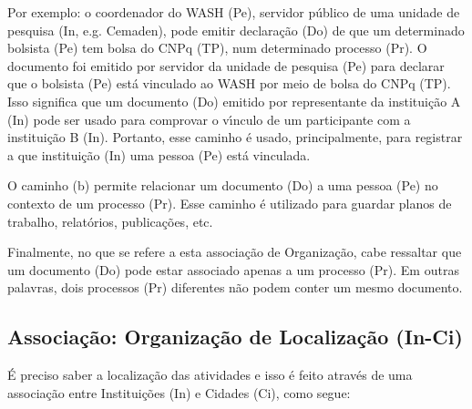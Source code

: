 \documentclass[
12pt,		%
openright,	%
twoside,  %
a4paper,			%
chapter=TITLE,		%
english,			%
french,				%
spanish,			%
brazil				%
]{USPSC-classe/USPSC}
\begin{document}
Por exemplo: o coordenador do WASH (Pe), servidor p\'ublico de uma unidade de pesquisa (In, e.g. Cemaden), pode emitir declara\c{c}\~ao (Do) de que um determinado bolsista (Pe) tem bolsa do CNPq (TP), num determinado processo (Pr). O documento foi emitido por servidor da unidade de pesquisa (Pe) para declarar que o bolsista (Pe) est\'a vinculado ao WASH por meio de bolsa do CNPq (TP). Isso significa que um documento (Do) emitido por representante da institui\c{c}\~ao A (In) pode ser usado para comprovar o v\'{\i}nculo de um participante com a institui\c{c}\~ao B (In). Portanto, esse caminho \'e usado, principalmente, para registrar a que institui\c{c}\~ao (In) uma pessoa (Pe) est\'a vinculada.




O caminho (b) permite relacionar um documento (Do) a uma pessoa (Pe) no contexto de um processo (Pr). Esse caminho \'e utilizado para guardar planos de trabalho, relat\'orios, publica\c{c}\~oes, etc.




Finalmente, no que se refere a esta associa\c{c}\~ao de \textquotedbl Organiza\c{c}\~ao\textquotedbl , cabe ressaltar que um documento (Do) pode estar associado apenas a um processo (Pr). Em outras palavras, dois processos (Pr) diferentes n\~ao podem conter um mesmo documento.




\subsection[Associa\c{c}\~ao: Organiza\c{c}\~ao de Localiza\c{c}\~ao (In-Ci)]{Associa\c{c}\~ao: Organiza\c{c}\~ao de Localiza\c{c}\~ao (In-Ci)}\label{Associa\c{c}\~ao: Organiza\c{c}\~ao de Localiza\c{c}\~ao (In-Ci)}
\'E preciso saber a localiza\c{c}\~ao das atividades e isso \'e feito atrav\'es de uma associa\c{c}\~ao entre Institui\c{c}\~oes (In) e Cidades (Ci), como segue:





\end{document}
